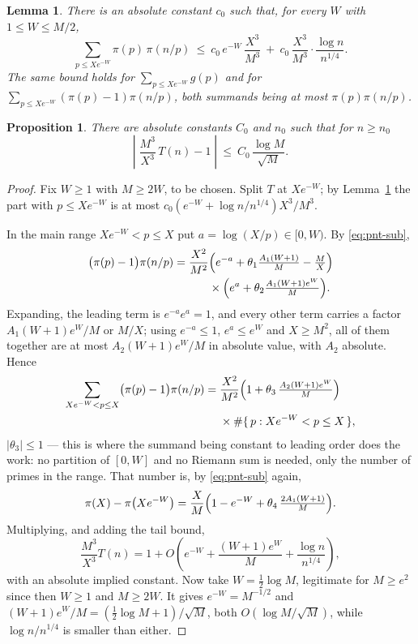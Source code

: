 \documentclass[10pt,a4paper]{amsart}
\newtheorem{lemma}{Lemma}
\newtheorem{proposition}{Proposition}
\begin{document}
\begin{lemma}\label{lem:tail}
  There is an absolute constant \(c_0\) such that, for every \(W\) with
  \(1 \le W \le M/2\),
  \[
    \sum_{p \le Xe^{-W}}\pi(p)\,\pi(n/p)
      \ \le \ c_0\,e^{-W}\,\frac{X^{3}}{M^{3}}
      \ +\ c_0\,\frac{X^{3}}{M^{3}} \cdot \frac{\log n}{n^{1/4}} .
  \]
  The same bound holds for \(\sum_{p \le Xe^{-W}}g(p)\) and for
  \(\sum_{p \le Xe^{-W}}(\pi(p)-1)\pi(n/p)\), both summands being at most
  \(\pi(p)\pi(n/p)\).
\end{lemma}

\begin{proposition}\label{prop:T}
  There are absolute constants \(C_0\) and \(n_0\) such that for \(n \ge n_0\)
  \[
    \left|\;\frac{M^{3}}{X^{3}}\,T(n)-1\;\right|
      \ \le \ C_0\,\frac{\log M}{\sqrt M} .
  \]
\end{proposition}

\begin{proof}
  Fix \(W \ge 1\) with \(M \ge 2W\), to be chosen. Split \(T\) at \(Xe^{-W}\); by
  Lemma~\ref{lem:tail} the part with \(p \le Xe^{-W}\) is at most
  \(c_0(e^{-W}+\log n/n^{1/4})X^{3}/M^{3}\).

  In the main range \(Xe^{-W} < p \le X\) put \(a = \log(X/p) \in [0,W)\). By
  \eqref{eq:pnt-sub},
  \begin{align*}
    \bigl(\pi(p)-1\bigr)\pi(n/p)
      =\frac{X^{2}}{M^{2}}
       &\Bigl(e^{-a}+\theta_1\tfrac{A_1(W+1)}{M}-\tfrac{M}{X}\Bigr)\\
       &\times
       \Bigl(e^{a}+\theta_2\tfrac{A_1(W+1)e^{W}}{M}\Bigr).
  \end{align*}
  Expanding, the leading term is \(e^{-a}e^{a} = 1\), and every other term
  carries a factor \(A_1(W+1)e^{W}/M\) or \(M/X\); using \(e^{-a} \le 1\),
  \(e^{a} \le e^{W}\) and \(X \ge M^{2}\), all of them together are at most
  \(A_2(W+1)e^{W}/M\) in absolute value, with \(A_2\) absolute. Hence
  \begin{align*}
    \sum_{Xe^{-W} < p \le X}\bigl(\pi(p)-1\bigr)\pi(n/p)
      ={}&\frac{X^{2}}{M^{2}}
          \Bigl(1+\theta_3\,\tfrac{A_2(W+1)e^{W}}{M}\Bigr)\\
        &\times \#\{\,p : Xe^{-W} < p \le X\,\},
  \end{align*}
  \(|\theta_3|\le 1\) --- this is where the summand being constant to leading
  order does the work: no partition of \([0,W]\) and no Riemann sum is needed,
  only the number of primes in the range. That number is, by
  \eqref{eq:pnt-sub} again,
  \[
    \pi(X)-\pi\bigl(Xe^{-W}\bigr)
      =\frac{X}{M}\Bigl(1-e^{-W}+\theta_4\,\tfrac{2A_1(W+1)}{M}\Bigr).
  \]
  Multiplying, and adding the tail bound,
  \[
    \frac{M^{3}}{X^{3}}T(n)
      =1+O\!\left(e^{-W}+\frac{(W+1)e^{W}}{M}+\frac{\log n}{n^{1/4}}\right),
  \]
  with an absolute implied constant. Now take \(W = \tfrac{1}{2}\log M\), legitimate
  for \(M \ge e^{2}\) since then \(W \ge 1\) and \(M \ge 2W\). It gives
  \(e^{-W} = M^{-1/2}\) and \((W+1)e^{W}/M = (\tfrac{1}{2}\log M+1)/\sqrt M\), both
  \(O(\log M/\sqrt M)\), while \(\log n/n^{1/4}\) is smaller than either.
\end{proof}
\end{document}

